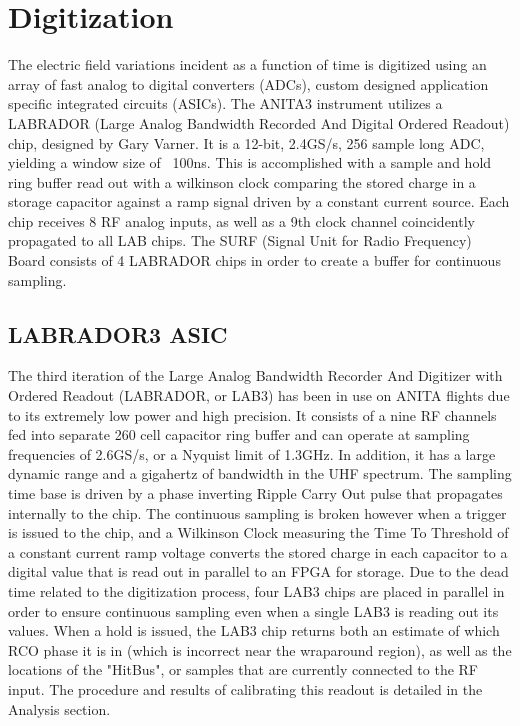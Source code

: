 	
\section{Digitization}
	The electric field variations incident as a function of time is digitized using an array of fast analog to digital converters (ADCs), custom designed application specific integrated circuits (ASICs).  The ANITA3 instrument utilizes a LABRADOR (Large Analog Bandwidth Recorded And Digital Ordered Readout) chip, designed by Gary Varner.  It is a 12-bit, 2.4GS/s, 256 sample long ADC, yielding a window size of ~100ns.  This is accomplished with a sample and hold ring buffer read out with a wilkinson clock comparing the stored charge in a storage capacitor against a ramp signal driven by a constant current source.  Each chip receives 8 RF analog inputs, as well as a 9th clock channel coincidently propagated to all LAB chips.  The SURF (Signal Unit for Radio Frequency) Board consists of 4 LABRADOR chips in order to create a buffer for continuous sampling.  
	\subsection{LABRADOR3 ASIC}
		The third iteration of the Large Analog Bandwidth Recorder And Digitizer with Ordered Readout (LABRADOR, or LAB3) has been in use on ANITA flights due to its extremely low power and high precision.  It consists of a nine RF channels fed into separate 260 cell capacitor ring buffer and can operate at sampling frequencies of 2.6GS/s, or a Nyquist limit of 1.3GHz.  In addition, it has a large dynamic range and a gigahertz of bandwidth in the UHF spectrum.  The sampling time base is driven by a phase inverting Ripple Carry Out pulse that propagates internally to the chip.  The continuous sampling is broken however when a trigger is issued to the chip, and a Wilkinson Clock measuring the Time To Threshold of a constant current ramp voltage converts the stored charge in each capacitor to a digital value that is read out in parallel to an FPGA for storage.  Due to the dead time related to the digitization process, four LAB3 chips are placed in parallel in order to ensure continuous sampling even when a single LAB3 is reading out its values.  When a hold is issued, the LAB3 chip returns both an estimate of which RCO phase it is in (which is incorrect near the wraparound region), as well as the locations of the "HitBus", or samples that are currently connected to the RF input. The procedure and results of calibrating this readout is detailed in the Analysis section.
	
